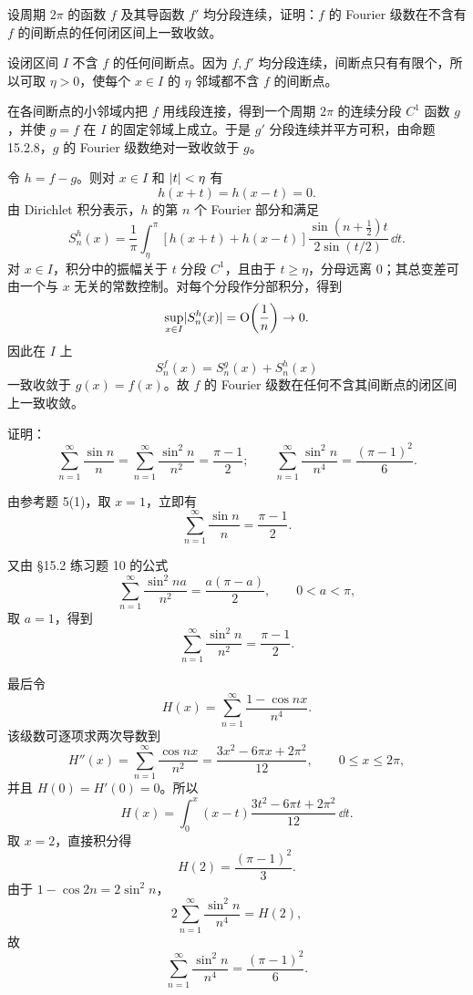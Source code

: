 \begin{xreferenceproblem}[9]
设周期 $2\pi$ 的函数 $f$ 及其导函数 $f'$ 均分段连续，证明：$f$ 的 Fourier 级数在不含有 $f$ 的间断点的任何闭区间上一致收敛。
\end{xreferenceproblem}
\begin{xsolution}
设闭区间 $I$ 不含 $f$ 的任何间断点。因为 $f,f'$ 均分段连续，间断点只有有限个，所以可取 $\eta>0$，使每个 $x\in I$ 的 $\eta$ 邻域都不含 $f$ 的间断点。

在各间断点的小邻域内把 $f$ 用线段连接，得到一个周期 $2\pi$ 的连续分段 $C^1$ 函数 $g$，并使 $g=f$ 在 $I$ 的固定邻域上成立。于是 $g'$ 分段连续并平方可积，由命题 15.2.8，$g$ 的 Fourier 级数绝对一致收敛于 $g$。

令 $h=f-g$。则对 $x\in I$ 和 $\lvert t\rvert<\eta$ 有
\[
  h(x+t)=h(x-t)=0.
\]
由 Dirichlet 积分表示，$h$ 的第 $n$ 个 Fourier 部分和满足
\[
  S_n^h(x)=\frac1\pi\int_{\eta}^{\pi}
  [h(x+t)+h(x-t)]
  \frac{\sin(n+\frac12)t}{2\sin(t/2)}\,\dd t.
\]
对 $x\in I$，积分中的振幅关于 $t$ 分段 $C^1$，且由于 $t\ge\eta$，分母远离 $0$；其总变差可由一个与 $x$ 无关的常数控制。对每个分段作分部积分，得到
\[
  \sup_{x\in I}\lvert S_n^h(x)\rvert=\mathrm{O}\!\left(\frac1n\right)\to0.
\]
因此在 $I$ 上
\[
  S_n^f(x)=S_n^g(x)+S_n^h(x)
\]
一致收敛于 $g(x)=f(x)$。故 $f$ 的 Fourier 级数在任何不含其间断点的闭区间上一致收敛。
\end{xsolution}


\begin{xreferenceproblem}[10]
证明：
  \[
    \sum_{n=1}^{\infty}\frac{\sin n}{n}
    =\sum_{n=1}^{\infty}\frac{\sin^2n}{n^2}
    =\frac{\pi-1}{2};
    \qquad
    \sum_{n=1}^{\infty}\frac{\sin^2n}{n^4}=\frac{(\pi-1)^2}{6}.
  \]
\end{xreferenceproblem}
\begin{xsolution}
由参考题 5(1)，取 $x=1$，立即有
\[
  \boxed{\displaystyle
  \sum_{n=1}^{\infty}\frac{\sin n}{n}=\frac{\pi-1}{2}}.
\]

又由 §15.2 练习题 10 的公式
\[
  \sum_{n=1}^{\infty}\frac{\sin^2na}{n^2}=\frac{a(\pi-a)}2,
  \qquad0<a<\pi,
\]
取 $a=1$，得到
\[
  \boxed{\displaystyle
  \sum_{n=1}^{\infty}\frac{\sin^2n}{n^2}=\frac{\pi-1}{2}}.
\]

最后令
\[
  H(x)=\sum_{n=1}^{\infty}\frac{1-\cos nx}{n^4}.
\]
该级数可逐项求两次导数到
\[
  H''(x)=\sum_{n=1}^{\infty}\frac{\cos nx}{n^2}
  =\frac{3x^2-6\pi x+2\pi^2}{12},
  \qquad0\le x\le2\pi,
\]
并且 $H(0)=H'(0)=0$。所以
\[
  H(x)=\int_0^x(x-t)
  \frac{3t^2-6\pi t+2\pi^2}{12}\,\dd t.
\]
取 $x=2$，直接积分得
\[
  H(2)=\frac{(\pi-1)^2}{3}.
\]
由于 $1-\cos2n=2\sin^2n$，
\[
  2\sum_{n=1}^{\infty}\frac{\sin^2n}{n^4}=H(2),
\]
故
\[
  \boxed{\displaystyle
  \sum_{n=1}^{\infty}\frac{\sin^2n}{n^4}=\frac{(\pi-1)^2}{6}}.
\]
\end{xsolution}



